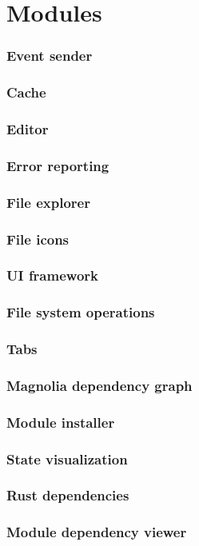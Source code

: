 \section{Modules}
\SectionPage

\begin{frame}
  \frametitle{Event sender}
\end{frame}

\begin{frame}
  \frametitle{Cache}
\end{frame}

\begin{frame}
  \frametitle{Editor}
\end{frame}

\begin{frame}
  \frametitle{Error reporting}
\end{frame}

\begin{frame}
  \frametitle{File explorer}
\end{frame}

\begin{frame}
  \frametitle{File icons}
\end{frame}

\begin{frame}
  \frametitle{UI framework}
\end{frame}

\begin{frame}
  \frametitle{File system operations}
\end{frame}

\begin{frame}
  \frametitle{Tabs}
\end{frame}

\begin{frame}
  \frametitle{Magnolia dependency graph}
\end{frame}

\begin{frame}
  \frametitle{Module installer}
\end{frame}

\begin{frame}
  \frametitle{State visualization}
\end{frame}

\begin{frame}
  \frametitle{Rust dependencies}
\end{frame}


\begin{frame}
  \frametitle{Module dependency viewer}
\end{frame}

